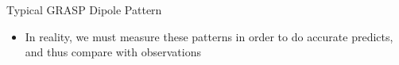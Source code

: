 \documentclass[pdf,azure,slideColor,colorBG]{prosper}
\begin{document}
\begin{slide}{Typical GRASP Dipole Pattern}
\begin{small}
\begin{itemize}
\item In reality, we must measure these patterns in order to do accurate 
predicts, and thus compare with observations
\end{itemize}
\end {small}
{\centering
{}
\par}
\end{slide}
\end{document}
